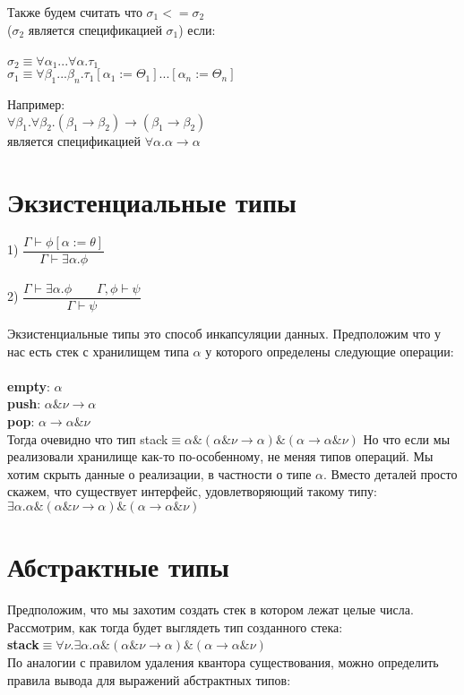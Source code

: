 	 Также будем считать что $ \sigma_1 <= \sigma_2 $\\
	 ($\sigma_2$ является спецификацией $\sigma_1$) если: \\\\
	 $\sigma_2\equiv\forall\alpha_1...\forall\alpha.\tau_1$\\
	 $\sigma_1\equiv\forall\beta_1...\beta_n.\tau_1[\alpha_1:=\Theta_1]...[\alpha_n:=\Theta_n]  $
	 
	 \noindent Например:\\
	 $ \forall\beta_1.\forall\beta_2.(\beta_1\rightarrow\beta_2)\rightarrow(\beta_1\rightarrow\beta_2) $\\
	 является спецификацией $ \forall\alpha.\alpha\rightarrow\alpha $\\
	 \section{Экзистенциальные типы}
	 1) $\dfrac{\Gamma\vdash\phi[\alpha:=\theta]}{\Gamma\vdash\exists\alpha.\phi}$\\ \\
	 2) $\dfrac{\Gamma\vdash\exists\alpha.\phi\qquad\Gamma,\phi\vdash\psi}{\Gamma\vdash\psi}$
	 
	  Экзистенциальные типы это способ инкапсуляции данных. Предположим что у нас есть стек с хранилищем типа $\alpha$ у которого определены следующие операции:\\\\
	 \textbf{empty}: $\alpha$\\
	 \textbf{push}: $\alpha\&\nu\rightarrow\alpha$\\
	 \textbf{pop}: $\alpha\rightarrow\alpha\&\nu$\\
	 
	 Тогда очевидно что тип stack$\equiv\alpha\&(\alpha\&\nu\rightarrow\alpha)\&(\alpha\rightarrow\alpha\&\nu)$
	 Но что если мы реализовали хранилище как-то по-особенному, не меняя типов операций. Мы хотим скрыть данные о реализации, в частности о типе $\alpha$. Вместо деталей просто скажем, что существует интерфейс, удовлетворяющий такому типу:\\$\exists\alpha.\alpha\&(\alpha\&\nu\rightarrow\alpha)\&(\alpha\rightarrow\alpha\&\nu)$
	 
	 \section{Абстрактные типы}	 
	 Предположим, что мы захотим создать стек в котором лежат целые числа. Рассмотрим, как тогда будет выглядеть тип созданного стека: \\
	 \textbf{stack}$\equiv\forall\nu.\exists\alpha.\alpha\&(\alpha\&\nu\rightarrow\alpha)\&(\alpha\rightarrow\alpha\&\nu)$\\
 	По аналогии с правилом удаления квантора существования, можно определить правила вывода для выражений абстрактных типов: \\

